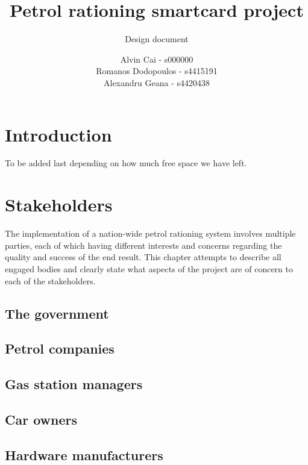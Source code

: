 \documentclass[a4paper,10pt]{llncs}
\title{Petrol rationing smartcard project}
\subtitle{Design document}
\author{Alvin Cai - s000000 \\ Romanos Dodopoulos - s4415191 \\ Alexandru Geana - s4420438}
\institute{}
\begin{document}
\maketitle

\section{Introduction}

To be added last depending on how much free space we have left.

\section{Stakeholders}

The implementation of a nation-wide petrol rationing system involves multiple parties, each of which having different interests and concerns regarding the quality and success of the end result. This chapter attempts to describe all engaged bodies and clearly state what aspects of the project are of concern to each of the stakeholders.

\subsection{The government}

\subsection{Petrol companies}

\subsection{Gas station managers}

\subsection{Car owners}

\subsection{Hardware manufacturers}
\end{document}
